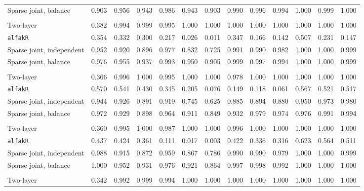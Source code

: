\begin{center}
\begin{tabular}{l*{12}{r}}
\quad Sparse joint, balance & 0.903 & 0.956 & 0.943 & 0.986 & 0.943 & 0.903 & 0.990 & 0.996 & 0.994 & 1.000 & 0.999 & 1.000 \\
\addlinespace[2pt]
\multicolumn{13}{l}{\textit{500/700, 360 d}} \\
\quad Two-layer & 0.382 & 0.994 & 0.999 & 0.995 & 1.000 & 1.000 & 1.000 & 1.000 & 1.000 & 1.000 & 1.000 & 1.000 \\
\quad \texttt{alfakR} & 0.354 & 0.332 & 0.300 & 0.217 & 0.026 & 0.011 & 0.347 & 0.166 & 0.142 & 0.507 & 0.231 & 0.147 \\
\quad Sparse joint, independent & 0.952 & 0.920 & 0.896 & 0.977 & 0.832 & 0.725 & 0.991 & 0.990 & 0.982 & 1.000 & 1.000 & 0.999 \\
\quad Sparse joint, balance & 0.976 & 0.955 & 0.937 & 0.993 & 0.950 & 0.905 & 0.999 & 0.997 & 0.994 & 1.000 & 1.000 & 0.999 \\
\addlinespace[2pt]
\multicolumn{13}{l}{\textit{500/700, 1080 d}} \\
\quad Two-layer & 0.366 & 0.996 & 1.000 & 0.995 & 1.000 & 1.000 & 0.978 & 1.000 & 1.000 & 1.000 & 1.000 & 1.000 \\
\quad \texttt{alfakR} & 0.570 & 0.541 & 0.430 & 0.345 & 0.205 & 0.076 & 0.149 & 0.118 & 0.061 & 0.567 & 0.521 & 0.517 \\
\quad Sparse joint, independent & 0.944 & 0.926 & 0.891 & 0.919 & 0.745 & 0.625 & 0.885 & 0.894 & 0.880 & 0.950 & 0.973 & 0.980 \\
\quad Sparse joint, balance & 0.972 & 0.929 & 0.898 & 0.964 & 0.911 & 0.849 & 0.932 & 0.979 & 0.974 & 0.976 & 0.991 & 0.994 \\
\addlinespace[2pt]
\multicolumn{13}{l}{\textit{500/700, bottleneck}} \\
\quad Two-layer & 0.360 & 0.995 & 1.000 & 0.987 & 1.000 & 1.000 & 0.996 & 1.000 & 1.000 & 1.000 & 1.000 & 1.000 \\
\quad \texttt{alfakR} & 0.437 & 0.424 & 0.361 & 0.111 & 0.017 & 0.003 & 0.422 & 0.336 & 0.316 & 0.623 & 0.564 & 0.511 \\
\quad Sparse joint, independent & 0.988 & 0.915 & 0.872 & 0.959 & 0.867 & 0.786 & 0.990 & 0.990 & 0.979 & 1.000 & 1.000 & 0.999 \\
\quad Sparse joint, balance & 1.000 & 0.952 & 0.931 & 0.976 & 0.921 & 0.864 & 0.997 & 0.998 & 0.992 & 1.000 & 1.000 & 1.000 \\
\addlinespace[2pt]
\multicolumn{13}{l}{\textit{100/3000, 360 d}} \\
\quad Two-layer & 0.342 & 0.992 & 0.999 & 0.994 & 1.000 & 1.000 & 1.000 & 1.000 & 1.000 & 1.000 & 1.000 & 1.000 \\

\end{tabular}
\end{center}
